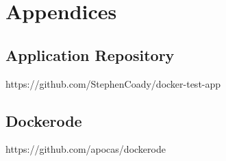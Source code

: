 \documentclass{article}
\begin{document}
\onehalfspacing
\tableofcontents

\newpage


\newpage


\newpage


\newpage



\newpage
\appendix
\section*{Appendices}
\renewcommand{\thesubsection}{\Alph{subsection}}

\subsection{Application Repository}
\label{appendix:code}
https://github.com/StephenCoady/docker-test-app

\subsection{Dockerode}
\label{appendix:dockerode}
https://github.com/apocas/dockerode

\newpage

\end{document}
